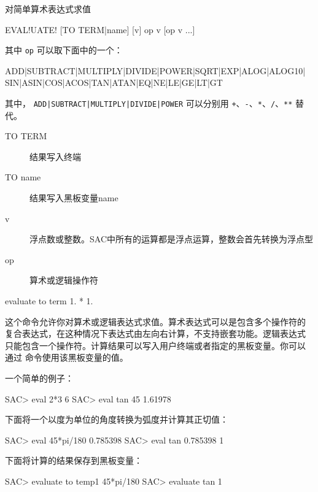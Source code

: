 \label{cmd:evaluate}

对简单算术表达式求值

\begin{SACSTX}
EVAL!UATE! [TO TERM|name] [v] op v [op v ...]
\end{SACSTX}
其中 \texttt{op} 可以取下面中的一个：
\begin{SACSTX}
ADD|SUBTRACT|MULTIPLY|DIVIDE|POWER|SQRT|EXP|ALOG|ALOG10|
SIN|ASIN|COS|ACOS|TAN|ATAN|EQ|NE|LE|GE|LT|GT
\end{SACSTX}
其中， \texttt{ADD|SUBTRACT|MULTIPLY|DIVIDE|POWER} 可以分别用
\texttt{+}、\texttt{-}、\texttt{*}、\texttt{/}、\texttt{**} 替代。

\begin{description}
\item [TO TERM] 结果写入终端
\item [TO name] 结果写入黑板变量name
\item [v] 浮点数或整数。SAC中所有的运算都是浮点运算，整数会首先转换为浮点型
\item [op] 算术或逻辑操作符
\end{description}

\begin{SACDFT}
evaluate to term 1. * 1.
\end{SACDFT}

这个命令允许你对算术或逻辑表达式求值。算术表达式可以是包含多个操作符的
复合表达式，在这种情况下表达式由左向右计算，不支持嵌套功能。逻辑表达式
只能包含一个操作符。计算结果可以写入用户终端或者指定的黑板变量。你可以
通过  命令使用该黑板变量的值。

一个简单的例子：
\begin{SACCode}
SAC> eval 2*3
 6
SAC> eval tan 45
1.61978
\end{SACCode}

下面将一个以度为单位的角度转换为弧度并计算其正切值：
\begin{SACCode}
SAC> eval 45*pi/180
 0.785398
SAC> eval tan 0.785398
 1
\end{SACCode}

下面将计算的结果保存到黑板变量：
\begin{SACCode}
SAC> evaluate to temp1 45*pi/180
SAC> evaluate tan %
 1
\end{SACCode}
